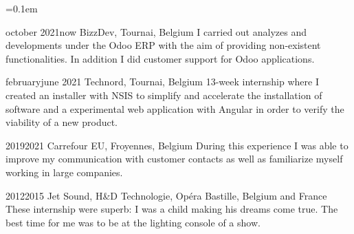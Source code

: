 \begin{indentsection}{\parindent}
  \parskip=0.1em
  \item[]
  {october 2021}{now}
  {BizzDev, Tournai, Belgium}
  {I carried out analyzes and developments under the Odoo ERP with the aim of providing non-existent functionalities. In addition I did customer support for Odoo applications.}

  {february}{june 2021}
  {Technord, Tournai, Belgium}
  {13-week internship where I created an installer with NSIS to simplify and accelerate the installation of software and a experimental web application with Angular in order to verify the viability of a new product.}

  \item[]
  {2019}{2021}
  {Carrefour EU, Froyennes, Belgium}
  {During this experience I was able to improve my communication with customer contacts as well as familiarize myself working in large companies.}

  \item[]
  {2012}{2015}
  {Jet Sound, H\&D Technologie, Opéra Bastille, Belgium and France}
  {These internship were superb: I was a child making his dreams come true. The best time for me was to be at the lighting console of a show.}
\end{indentsection}
